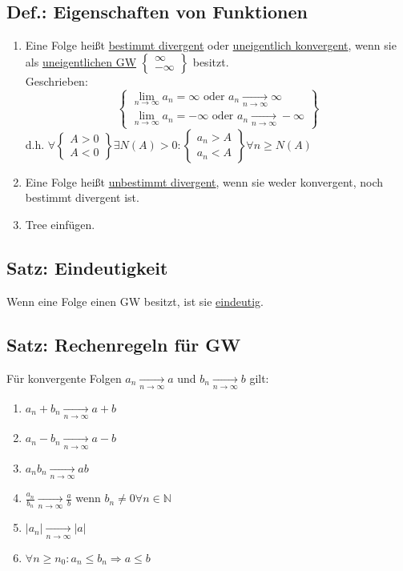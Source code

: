 \documentclass[a4paper,11pt]{article}
\begin{document}
\subsection{Def.: Eigenschaften von Funktionen}
\begin{enumerate}[label={\alph*)}]
	\item Eine Folge heißt \underline{bestimmt divergent} oder \underline{uneigentlich konvergent}, wenn sie als \underline{uneigentlichen GW}
		$\begin{Bmatrix}
			\infty\\
			-\infty
		\end{Bmatrix}$ besitzt.\\
		Geschrieben:
		\[\begin{Bmatrix}
			\underset{n\rightarrow\infty}{\lim}a_n=\infty\text{ oder }a_n\underset{n\to\infty}{\to}\infty\\
			\underset{n\rightarrow\infty}{\lim}a_n=-\infty\text{ oder }a_n\underset{n\to\infty}{\rightarrow}-\infty
		\end{Bmatrix}\]
		d.h. $\forall\begin{Bmatrix}A>0\\A<0\end{Bmatrix}\exists N(A)>0: \begin{Bmatrix}a_n>A\\a_n<A\end{Bmatrix}\forall n\geq N(A)$
	\item Eine Folge heißt \underline{unbestimmt divergent}, wenn sie weder konvergent, noch bestimmt divergent ist.
	\item Tree einfügen.
\end{enumerate}
\subsection{Satz: Eindeutigkeit}
Wenn eine Folge einen GW besitzt, ist sie \underline{eindeutig}.
\subsection{Satz: Rechenregeln für GW}
Für konvergente Folgen $a_n\underset{n\to\infty}{\rightarrow}a$ und $b_n\underset{n\to\infty}{\to}b$ gilt:
\begin{enumerate}[label={\alph*)}]
	\item $a_n+b_n\underset{n\to\infty}{\to}a+b$
	\item $a_n-b_n\underset{n\to\infty}{\to}a-b$
	\item $a_nb_n\underset{n\to\infty}{\to}ab$
	\item $\frac{a_n}{b_n}\underset{n\to\infty}{\to}\frac{a}{b}$ wenn $b_n\neq 0\forall n\in\mathbb{N}$
	\item $|a_n|\underset{n\to\infty}{\to}|a|$
	\item $\forall n\geq n_0:a_n\leq b_n\Rightarrow a\leq b$
\end{enumerate}
\end{document}
